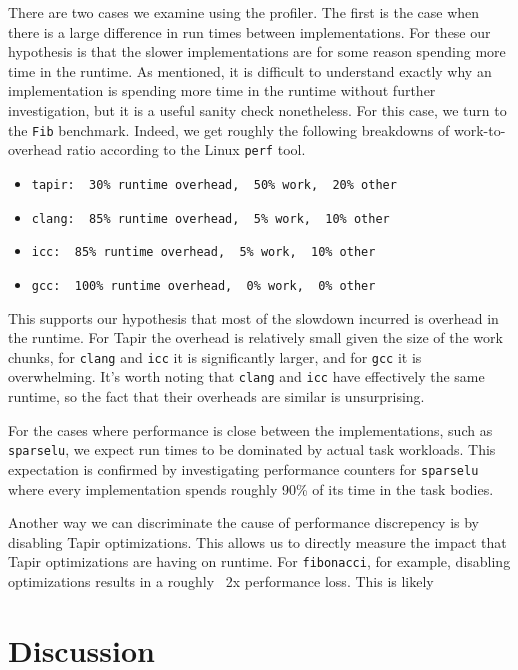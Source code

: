 \documentclass[sigconf]{acmart}
\begin{document}
There are two cases we examine using the profiler. The first is the
case when there is a large difference in run times between implementations. For 
these our hypothesis is that the slower implementations
are for some reason spending more time in the runtime. As mentioned, 
it is difficult to understand exactly why an implementation is spending more 
time in the runtime without further investigation, but it is a useful 
sanity check nonetheless. For this case, we turn to the \texttt{Fib} benchmark.
Indeed, we get roughly the following breakdowns of work-to-overhead ratio
according to the Linux \texttt{perf} tool.
\begin{itemize}
\item \texttt{tapir: ~30\% runtime overhead, ~50\% work, ~20\% other}
\item \texttt{clang: ~85\% runtime overhead, ~5\% work, ~10\% other}
\item \texttt{icc: ~85\% runtime overhead, ~5\% work, ~10\% other}
\item \texttt{gcc: ~100\% runtime overhead, ~0\% work, ~0\% other}
\end{itemize}
This supports our hypothesis that most of the slowdown incurred is overhead in
the runtime. For Tapir the overhead is relatively small given the size of the
work chunks, for \texttt{clang} and \texttt{icc} it is significantly larger,
and for \texttt{gcc} it is overwhelming. It's worth noting that \texttt{clang} 
and \texttt{icc} have effectively the same runtime, so the fact that their 
overheads are similar is unsurprising. 

For the cases where performance is close between the implementations, such as
\texttt{sparselu}, we expect run times to be dominated by actual task workloads. This 
expectation is confirmed by investigating performance counters for \texttt{sparselu}
where every implementation spends roughly 90\% of its time in the task
bodies. 

Another way we can discriminate the cause of performance discrepency is by disabling 
Tapir optimizations. This allows us to directly measure the impact that Tapir
optimizations are having on runtime. For \texttt{fibonacci}, for example,
disabling optimizations results in a roughly ~2x performance loss. This is likely


\section{Discussion} \label{Sec:Discussion}
\end{document}
